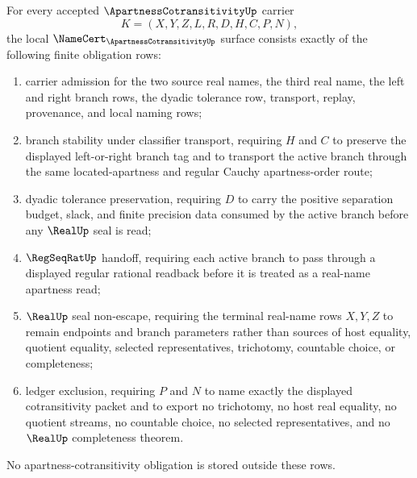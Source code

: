 \begin{theorem}
\label{thm:apartness-cotransitivity-namecert-obligations}
For every accepted $\ApartnessCotransitivityUp$ carrier
$$
K=(X,Y,Z,L,R,D,H,C,P,N),
$$
the local $\NameCert_{\ApartnessCotransitivityUp}$ surface consists exactly of the following finite obligation rows:
\begin{enumerate}
\item carrier admission for the two source real names, the third real name, the left and right branch rows, the dyadic tolerance row, transport, replay, provenance, and local naming rows;
\item branch stability under classifier transport, requiring $H$ and $C$ to preserve the displayed left-or-right branch tag and to transport the active branch through the same located-apartness and regular Cauchy apartness-order route;
\item dyadic tolerance preservation, requiring $D$ to carry the positive separation budget, slack, and finite precision data consumed by the active branch before any $\RealUp$ seal is read;
\item $\RegSeqRatUp$ handoff, requiring each active branch to pass through a displayed regular rational readback before it is treated as a real-name apartness read;
\item $\RealUp$ seal non-escape, requiring the terminal real-name rows $X,Y,Z$ to remain endpoints and branch parameters rather than sources of host equality, quotient equality, selected representatives, trichotomy, countable choice, or completeness;
\item ledger exclusion, requiring $P$ and $N$ to name exactly the displayed cotransitivity packet and to export no trichotomy, no host real equality, no quotient streams, no countable choice, no selected representatives, and no $\RealUp$ completeness theorem.
\end{enumerate}
No apartness-cotransitivity obligation is stored outside these rows.
\end{theorem}
